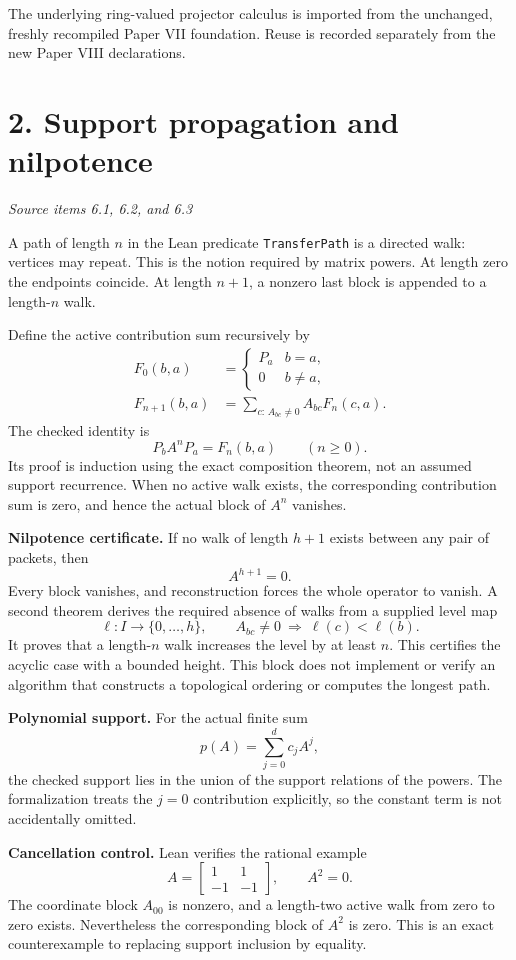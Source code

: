 \documentclass[11pt]{article}
\newcommand{\code}[1]{\texttt{\small #1}}
\newcommand{\pageheading}[2]{\section*{\color{ink}#1}\textit{#2}\par}
\begin{document}
The underlying ring-valued projector calculus is imported from the unchanged, freshly recompiled Paper VII foundation. Reuse is recorded separately from the new Paper VIII declarations.

\newpage
\pageheading{2. Support propagation and nilpotence}{Source items 6.1, 6.2, and 6.3}
A path of length $n$ in the Lean predicate \code{TransferPath} is a directed walk: vertices may repeat. This is the notion required by matrix powers. At length zero the endpoints coincide. At length $n+1$, a nonzero last block is appended to a length-$n$ walk.

Define the active contribution sum recursively by
\begin{align*}
F_0(b,a)&=\begin{cases}P_a&b=a,\\0&b\ne a,\end{cases}\\
F_{n+1}(b,a)&=\sum_{c:\,A_{bc}\ne0}A_{bc}F_n(c,a).
\end{align*}
The checked identity is
\[
\boxed{P_bA^nP_a=F_n(b,a)\qquad(n\ge0).}
\]
Its proof is induction using the exact composition theorem, not an assumed support recurrence. When no active walk exists, the corresponding contribution sum is zero, and hence the actual block of $A^n$ vanishes.

\textbf{Nilpotence certificate.} If no walk of length $h+1$ exists between any pair of packets, then
\[
\boxed{A^{h+1}=0.}
\]
Every block vanishes, and reconstruction forces the whole operator to vanish. A second theorem derives the required absence of walks from a supplied level map
\[
\ell:I\longrightarrow\{0,\ldots,h\},\qquad
A_{bc}\ne0\ \Longrightarrow\ \ell(c)<\ell(b).
\]
It proves that a length-$n$ walk increases the level by at least $n$. This certifies the acyclic case with a bounded height. This block does not implement or verify an algorithm that constructs a topological ordering or computes the longest path.

\textbf{Polynomial support.} For the actual finite sum
\[
p(A)=\sum_{j=0}^{d}c_jA^j,
\]
the checked support lies in the union of the support relations of the powers. The formalization treats the $j=0$ contribution explicitly, so the constant term is not accidentally omitted.

\textbf{Cancellation control.} Lean verifies the rational example
\[
A=\begin{bmatrix}1&1\\-1&-1\end{bmatrix},\qquad A^2=0.
\]
The coordinate block $A_{00}$ is nonzero, and a length-two active walk from zero to zero exists. Nevertheless the corresponding block of $A^2$ is zero. This is an exact counterexample to replacing support inclusion by equality.
\end{document}

